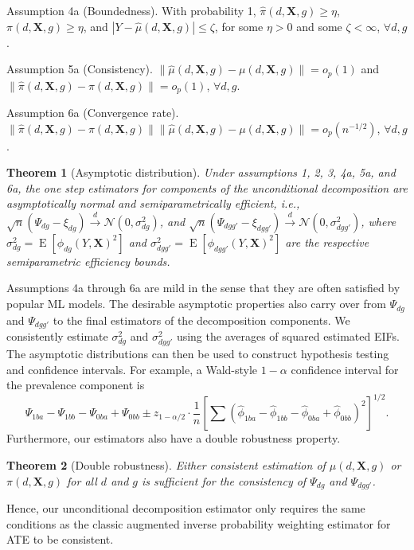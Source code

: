 \documentclass[12pt,a4paper]{article}
\newtheorem{prop}{Theorem}
\newcommand{\E}{\operatorname{E}}
\def\X{{\boldsymbol X}}
\begin{document}
Assumption 4a (Boundedness). With probability 1, $\hat{\pi}(d,\X,g) \geq \eta$, $\pi(d,\X,g) \geq \eta$, and $|Y-\hat{\mu}(d,\X,g)| \leq \zeta$, for some $\eta>0$ and some $\zeta < \infty$, $\forall d, g$.

Assumption 5a (Consistency).  $\| \hat{\mu}(d,\X,g) - \mu(d,\X,g) \| =o_p(1)$ and $\| \hat{\pi}(d,\X,g) - \pi(d,\X,g) \| =o_p(1)$, $\forall d, g$.

Assumption 6a (Convergence rate).  $\|\hat{\pi}(d,\X,g)-\pi(d,\X,g)\| \|\hat{\mu}(d,\X,g)-\mu(d,\X,g)\|=o_p(n^{-1/2})$, $\forall d, g$.

\begin{prop}[Asymptotic distribution]
Under assumptions 1, 2, 3, 4a, 5a, and 6a, the one step estimators for components of the unconditional decomposition are asymptotically normal and semiparametrically efficient, i.e., $\sqrt{n}(\Psi_{dg} - \xi_{dg}) \xrightarrow{d} \mathcal{N}(0, \sigma^2_{dg})$, and $\sqrt{n}(\Psi_{dgg'} - \xi_{dgg'}) \xrightarrow{d} \mathcal{N}(0, \sigma^2_{dgg'})$, where $\sigma^2_{dg}=\E[\phi_{dg}(Y,\X)^2]$ and $\sigma^2_{dgg'}=\E[\phi_{dgg'}(Y,\X)^2]$ are the respective semiparametric efficiency bounds. 
\end{prop}
Assumptions 4a through 6a are mild in the sense that they are often satisfied by popular ML models. The desirable asymptotic properties also carry over from $\Psi_{dg}$ and $\Psi_{dgg'}$ to the final estimators of the decomposition components. We consistently estimate $\sigma^2_{dg}$ and $\sigma^2_{dgg'}$ using the  averages of squared estimated EIFs. The asymptotic distributions can then be used to construct hypothesis testing and confidence intervals. For example, a Wald-style $1-\alpha$ confidence interval for the prevalence component is $$\Psi_{1ba}-\Psi_{1bb}-\Psi_{0ba}+\Psi_{0bb} \pm z_{1-\alpha/2} \cdot \frac{1}{n} \left[\sum  \left(\hat{\phi}_{1ba}-\hat{\phi}_{1bb}-  \hat{\phi}_{0ba}+\hat{\phi}_{0bb}\right)^2 \right]^{1/2}.$$ Furthermore, our estimators also have a double robustness property. 

\begin{prop}[Double robustness]
Either consistent estimation of $\mu(d,\X,g)$ or $\pi(d,\X,g)$ for all $d$ and $g$ is sufficient for the consistency of $\Psi_{dg}$ and $\Psi_{dgg'}$.  
\end{prop}
Hence, our unconditional decomposition estimator only requires the same conditions as the classic augmented inverse probability weighting estimator for ATE \citep{robins_estimation_1994, hirano_efficient_2003} to be consistent. 
\end{document}
